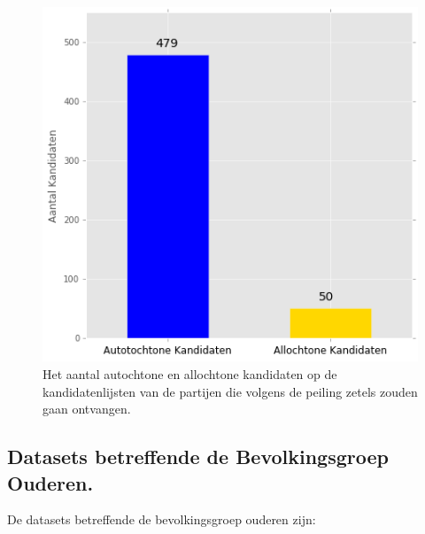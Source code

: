 \begin{figure}[H]
\centering
	\includegraphics[width=0.42\linewidth]{aa_kandidaten.png}

			\caption{Het aantal autochtone en allochtone kandidaten op de kandidatenlijsten van de partijen die volgens de peiling zetels zouden gaan ontvangen.}

\label{fig:aaKandidaten}
\end{figure}


\subsection{Datasets betreffende de Bevolkingsgroep Ouderen.}
De datasets betreffende de bevolkingsgroep ouderen zijn:\\

